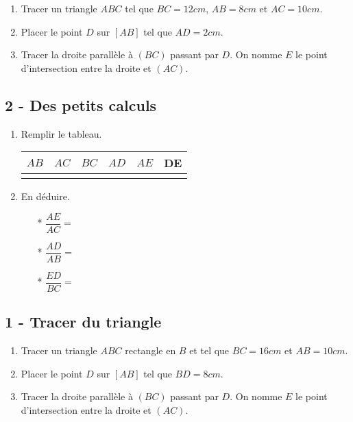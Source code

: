 \documentclass[11pt]{article}
\begin{document}
\begin{enumerate}
\item Tracer un triangle $ABC$ tel que $BC = 12cm$, $AB = 8cm$ et $AC = 10cm$.
\item Placer le point $D$ sur $[AB]$ tel que $AD = 2cm$.
\item Tracer la droite parallèle à $(BC)$ passant par $D$. On nomme $E$ le point d'intersection entre la droite et $(AC)$.
\end{enumerate}

\subsection*{2 - Des petits calculs}

\begin{enumerate}

\item Remplir le tableau.
  \begin{center}
    \begin{tabular}{| c | c | c | c | c | c |}
      \hline
      $AB$    & $AC$ & $BC$ & $AD$ & $AE$  & DE \\
      \hline
      \phantom{1234567890} & \phantom{1234567890} & \phantom{1234567890} & \phantom{1234567890} & \phantom{1234567890} &  \phantom{1234567890} \\
      \hline
    \end{tabular}
  \end{center}

\item En déduire.
  \begin{multicols}{3}
    \begin{itemize}
    \item[*] $\dfrac{AE}{AC} = $
    \item[*] $\dfrac{AD}{AB} = $
    \item[*] $\dfrac{ED}{BC} = $
    \end{itemize}
  \end{multicols}
\end{enumerate}

\newpage

\subsection*{1 - Tracer du triangle}

\begin{enumerate}
\item Tracer un triangle $ABC$ rectangle en $B$ et tel que $BC = 16cm$ et $AB = 10cm$.
\item Placer le point $D$ sur $[AB]$ tel que $BD = 8cm$.
\item Tracer la droite parallèle à $(BC)$ passant par $D$. On nomme $E$ le point d'intersection entre la droite et $(AC)$.
\end{enumerate}
\end{document}
